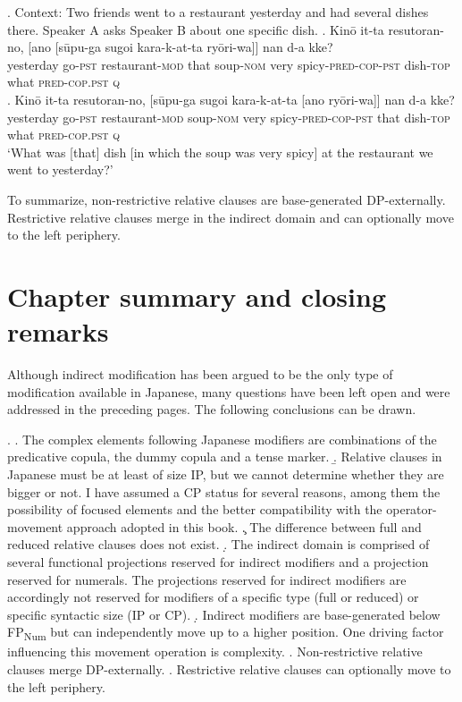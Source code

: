 \documentclass [output=book,colorlinks,citecolor=brown]{langscibook}
\begin{document}
\ex. Context: Two friends went to a restaurant yesterday and had several dishes there. Speaker A asks Speaker B about one specific dish.
 \ag. Kinō it-ta resutoran-no, [ano [sūpu-ga sugoi kara-k-at-ta ryōri-wa]] nan d-a kke?\\
yesterday go-\textsc{pst} restaurant-\textsc{mod} that soup-\textsc{nom} very spicy-\textsc{pred-cop-pst} dish-\textsc{top} what \textsc{pred-cop.pst} \textsc{q} \\
\bg. Kinō it-ta resutoran-no, [sūpu-ga sugoi kara-k-at-ta [ano ryōri-wa]] nan d-a kke?\\
yesterday go-\textsc{pst} restaurant-\textsc{mod} soup-\textsc{nom} very spicy-\textsc{pred-cop-pst} that dish-\textsc{top} what \textsc{pred-cop.pst} \textsc{q}\\
`What was [that] dish [in which the soup was very spicy] at the restaurant we went to yesterday?’

To summarize, non-restrictive relative clauses are base-generated DP-externally. Restrictive relative clauses merge in the indirect domain and can optionally move to the left periphery.

\newpage

\section{Chapter summary and closing remarks}

Although indirect modification has been argued to be the only type of modification available in Japanese, many questions have been left open and were addressed in the preceding pages. The following conclusions can be drawn.

\ex. \a. The complex elements following Japanese modifiers are combinations of the predicative copula, the dummy copula and a tense marker.
\b. Relative clauses in Japanese must be at least of size IP, but we cannot determine whether they are bigger or not. I have assumed a CP status for several reasons, among them the possibility of focused elements and the better compatibility with the operator-movement approach adopted in this book.
\c. The difference between full and reduced relative clauses does not exist.
\d. The indirect domain is comprised of several functional projections reserved for indirect modifiers and a projection reserved for numerals. The projections reserved for indirect modifiers are accordingly not reserved for modifiers of a specific type (full or reduced) or specific syntactic size (IP or CP).
\d. Indirect modifiers are base-generated below FP\textsubscript{Num} but can independently move up to a higher position. One driving factor influencing this movement operation is complexity.
\e. Non-restrictive relative clauses merge DP-externally.
\e. Restrictive relative clauses can optionally move to the left periphery.
\end{document}
